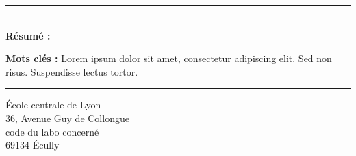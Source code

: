 \documentclass[a4paper,12pt,french]{article}
\begin{document}
\vspace*{\fill}
\noindent\rule[2pt]{\textwidth}{0.5pt}\\
{\textbf{Résumé :}}
\lipsum[1]

{\noindent\textbf{Mots clés :}}
Lorem ipsum dolor sit amet, consectetur adipiscing elit. Sed non risus. Suspendisse lectus tortor.
\\
\noindent\rule[2pt]{\textwidth}{0.5pt}
\begin{center}
  École centrale de Lyon\\
  36, Avenue Guy de Collongue\\
  code du labo concerné\\
  69134 Écully
\end{center}
\vspace*{\fill}
\end{document}
